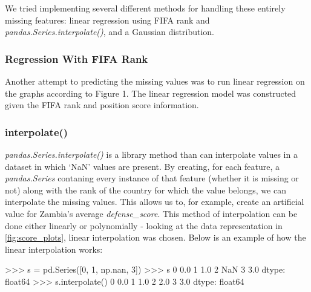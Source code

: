 We tried implementing several different methods for handling these entirely missing features: linear regression using FIFA rank and \textit{pandas.Series.interpolate()}, and a Gaussian distribution.

\subsubsection{Regression With FIFA Rank}
Another attempt to predicting the missing values was to run linear regression on the graphs according to Figure 1. The linear regression model was constructed given the FIFA rank and position score information.

\subsubsection{interpolate()}
\textit{pandas.Series.interpolate()} \cite{interpolate} is a library method than can interpolate values in a dataset in which `NaN' values are present. By creating, for each feature, a \textit{pandas.Series} contaning every instance of that feature (whether it is missing or not) along with the rank of the country for which the value belongs, we can interpolate the missing values. This allows us to, for example, create an artificial value for Zambia's average \textit{defense\_score}. This method of interpolation can be done either linearly or polynomially - looking at the data representation in \ref{fig:score_plots}, linear interpolation was chosen. Below is an example of how the linear interpolation works:

\tiny{
\begin{python}
    >>> s = pd.Series([0, 1, np.nan, 3])
    >>> s
    0    0.0
    1    1.0
    2    NaN
    3    3.0
    dtype: float64
    >>> s.interpolate()
    0    0.0
    1    1.0
    2    2.0
    3    3.0
    dtype: float64
\end{python}
}
\small

